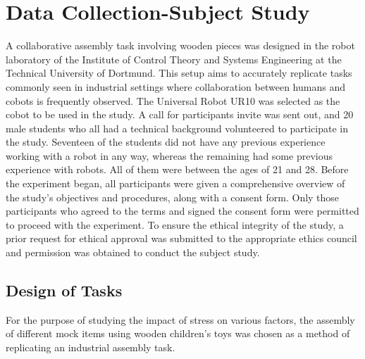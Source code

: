 \chapter{Data Collection-Subject Study}

A collaborative assembly task involving wooden pieces was designed in the robot laboratory of the Institute of Control Theory and Systems Engineering at the Technical University of Dortmund. This setup aims to accurately replicate tasks commonly seen in industrial settings where collaboration between humans and cobots is frequently observed. The Universal Robot UR10 was selected as the cobot to be used in the study. A call for participants invite was sent out, and 20 male students who all had a technical background volunteered to participate in the study. Seventeen of the students did not have any previous experience working with a robot in any way, whereas the remaining
had some previous experience with robots. All of them were between the ages of 21 and 28. Before the experiment began, all participants were given a comprehensive overview of the study's objectives and procedures, along with a consent form. Only those participants who agreed to the terms and signed the consent form were permitted to proceed with the experiment. To ensure the ethical integrity of the study, a prior request for ethical approval was submitted to the appropriate ethics council and permission was obtained to conduct the subject study.

\section{Design of Tasks}
For the purpose of studying the impact of stress on various factors, the assembly of different mock items using wooden children's toys was chosen as a method of replicating an industrial assembly task.

